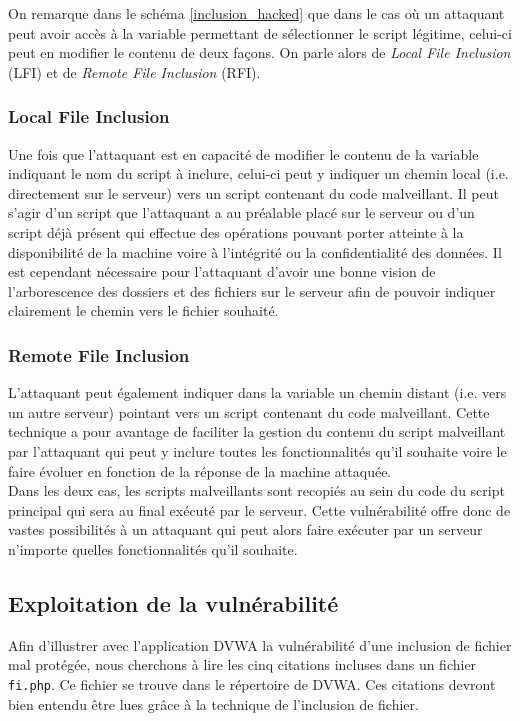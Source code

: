 On remarque dans le schéma \ref{inclusion_hacked} que dans le cas où un attaquant peut avoir accès à la variable permettant de sélectionner le script légitime, celui-ci peut en modifier le contenu de deux façons. On parle alors de \textit{Local File Inclusion} (LFI) et de \textit{Remote File Inclusion} (RFI).

\subsubsection{Local File Inclusion}

Une fois que l'attaquant est en capacité de modifier le contenu de la variable indiquant le nom du script à inclure, celui-ci peut y indiquer un chemin local (i.e. directement sur le serveur) vers un script contenant du code malveillant. Il peut s'agir d'un script que l'attaquant a au préalable placé sur le serveur ou d'un script déjà présent qui effectue des opérations pouvant porter atteinte à la disponibilité de la machine voire à l'intégrité ou la confidentialité des données. Il est cependant nécessaire pour l'attaquant d'avoir une bonne vision de l'arborescence des dossiers et des fichiers sur le serveur afin de pouvoir indiquer clairement le chemin vers le fichier souhaité.

\subsubsection{Remote File Inclusion}

L'attaquant peut également indiquer dans la variable un chemin distant (i.e. vers un autre serveur) pointant vers un script contenant du code malveillant. Cette technique a pour avantage de faciliter la gestion du contenu du script malveillant par l'attaquant qui peut y inclure toutes les fonctionnalités qu'il souhaite voire le faire évoluer en fonction de la réponse de la machine attaquée.\\

Dans les deux cas, les scripts malveillants sont recopiés au sein du code du script principal qui sera au final exécuté par le serveur. Cette vulnérabilité offre donc de vastes possibilités à un attaquant qui peut alors faire exécuter par un serveur n'importe quelles fonctionnalités qu'il souhaite.

\subsection{Exploitation de la vulnérabilité}
\label{expl_fi}
Afin d'illustrer avec l'application DVWA la vulnérabilité d'une inclusion de fichier mal protégée, nous cherchons à lire les cinq citations incluses dans un fichier \texttt{fi.php}. Ce fichier se trouve dans le répertoire  de DVWA. Ces citations devront bien entendu être lues grâce à la technique de l'inclusion de fichier. 

